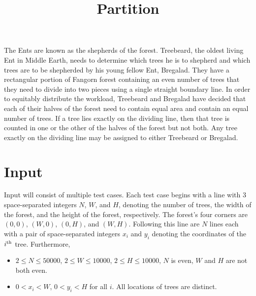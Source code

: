 \documentclass{article}
\title{Partition}
\date{}
\begin{document}
\maketitle

The Ents are known as the shepherds of the forest. Treebeard, the oldest living
Ent in Middle Earth, needs to determine which trees he is to shepherd and which
trees are to be shepherded by his young fellow Ent, Bregalad. They have a
rectangular portion of Fangorn forest containing an even number of trees that
they need to divide into two pieces using a single straight boundary line.  In
order to equitably distribute the workload, Treebeard and Bregalad have
decided that each of their halves of the forest need to contain equal area and
contain an equal number of trees. If a tree lies exactly on the dividing line,
then that tree is counted in one or the other of the halves of the forest but
not both.  Any tree exactly on the dividing line may be assigned to
either Treebeard or Bregalad.


\section{Input}

Input will consist of multiple test cases.  Each test case begins with a line
with 3 space-separated integers $N$, $W$, and $H$, denoting the number of
trees, the width of the forest, and the height of the forest, respectively.
The forest's four corners are $(0,0)$, $(W,0)$, $(0,H)$, and $(W,H)$.
Following this line are $N$ lines each with a pair of space-separated integers
$x_i$ and $y_i$ denoting the coordinates of the 
$i^{\mbox{\scriptsize{th}}}$
tree.  Furthermore,
\begin{itemize}

\item $2 \le N \le 50000$, $2 \le W \le 10000$, $2 \le H \le 10000$, $N$ is even, $W$
and $H$ are not both even.
\item $0 < x_i < W$, $0 < y_i < H$ for all $i$.  All locations of
trees are distinct.
\end{itemize}
\end{document}
